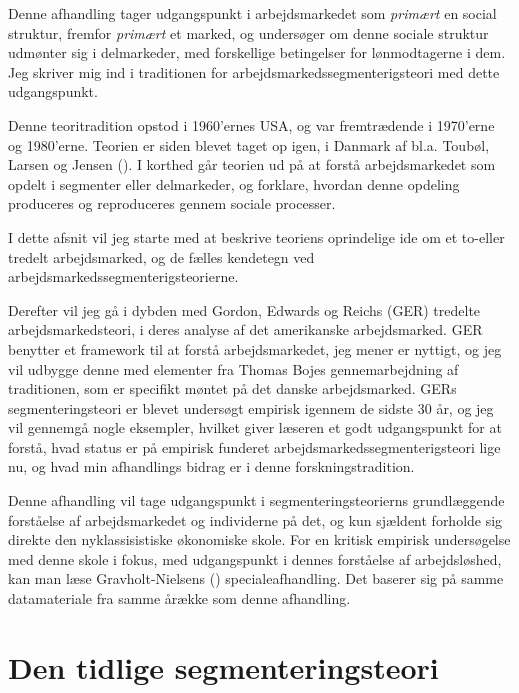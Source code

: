 Denne afhandling tager udgangspunkt i arbejdsmarkedet som \emph{primært} en social struktur, fremfor \emph{primært} et marked, og undersøger om denne sociale struktur udmønter sig i delmarkeder, med forskellige betingelser for lønmodtagerne i dem. Jeg skriver mig ind i traditionen for arbejdsmarkedssegmenterigsteori med dette udgangspunkt.

Denne teoritradition opstod i 1960'ernes USA, og var fremtrædende i 1970'erne og 1980'erne. Teorien er siden blevet taget op igen, i Danmark af bl.a. Toubøl, Larsen og Jensen (\citeyear{Touboel2013}). I korthed går teorien ud på at forstå arbejdsmarkedet som opdelt i segmenter eller delmarkeder, og forklare, hvordan denne opdeling produceres og reproduceres gennem sociale processer.

I dette afsnit vil jeg starte med at beskrive teoriens oprindelige ide om et to-eller tredelt arbejdsmarked, og de fælles kendetegn ved arbejdsmarkedssegmenterigsteorierne.

Derefter vil jeg gå i dybden med Gordon, Edwards og Reichs (GER) tredelte arbejdsmarkedsteori, i deres analyse af det amerikanske arbejdsmarked. GER benytter et framework til at forstå arbejdsmarkedet, jeg mener er nyttigt, og jeg vil udbygge denne med elementer fra Thomas Bojes gennemarbejdning af traditionen, som er specifikt møntet på det danske arbejdsmarked.
GERs segmenteringsteori er blevet undersøgt empirisk igennem de sidste 30 år, og jeg vil gennemgå nogle eksempler,  hvilket giver læseren et godt udgangspunkt for at forstå, hvad status er på empirisk funderet arbejdsmarkedssegmenterigsteori lige nu, og hvad min afhandlings bidrag er i denne forskningstradition. 

Denne afhandling vil tage udgangspunkt i segmenteringsteorierns grundlæggende forståelse af  arbejdsmarkedet og individerne på det, og kun sjældent forholde sig direkte den nyklassisistiske økonomiske skole. For en kritisk empirisk undersøgelse med denne skole i fokus, med udgangspunkt i dennes forståelse af arbejdsløshed, kan man læse Gravholt-Nielsens (\citeyear{Gravholt-Nielsen2016}) specialeafhandling. Det baserer sig på samme datamateriale fra samme årække som denne afhandling. 


\section{Den tidlige segmenteringsteori \label{AST_overordnet}}

